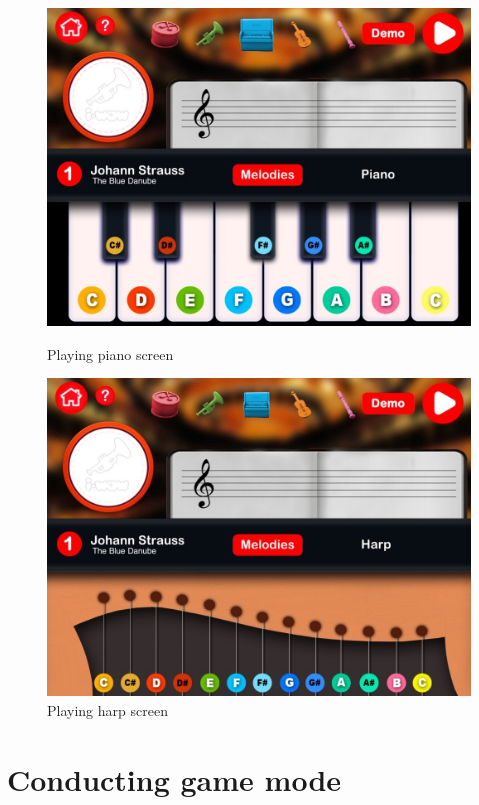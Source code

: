 \begin{figure}[ht!]
  \centering
  \includegraphics[width=350pt]{graphics/use-case/playing_piano_screen.jpg}
  \vspace{0.05cm}
  \caption{Playing piano screen}
  \label{fig:playing_piano_screen}
  \vspace{0.6cm}

  \includegraphics[width=350pt]{graphics/use-case/playing_harp_screen.jpg}
  \vspace{0.05cm}
  \caption{Playing harp screen}
  \label{fig:playing_harp_screen}
\end{figure}

\section{Conducting game mode}

